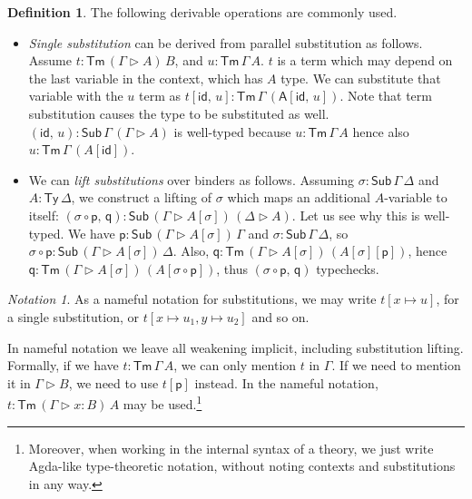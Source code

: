 \documentclass[12pt,a4paper,twoside,openany]{book}
\theoremstyle{remark}
\newtheorem{notation}{Notation}
\theoremstyle{definition}
\newtheorem{mydefinition}{Definition}
\newcommand{\id}{\mathsf{id}}
\newcommand{\Sub}{\mathsf{Sub}}
\newcommand{\Tm}{\mathsf{Tm}}
\newcommand{\Ty}{\mathsf{Ty}}
\newcommand{\ext}{\triangleright}
\newcommand{\p}{\mathsf{p}}
\newcommand{\q}{\mathsf{q}}
\newcommand{\A}{\mathsf{A}}
\begin{document}
\begin{mydefinition} The following derivable operations are commonly used.
\label{def:cwfops}
  \begin{itemize}
    \item \emph{Single substitution} can be derived from parallel substitution
      as follows. Assume $t : \Tm\,(\Gamma\ext A)\,B$, and $u :
      \Tm\,\Gamma\,A$. $t$ is a term which may depend on the last variable in
      the context, which has $A$ type. We can substitute that variable with the
      $u$ term as $t[\id,\,u] : \Tm\,\Gamma\,(\A[\id,\,u])$. Note that term
      substitution causes the type to be substituted as well. $(\id,\,u) :
      \Sub\,\Gamma\,(\Gamma\ext A)$ is well-typed because $u : \Tm\,\Gamma\,A$
      hence also $u : \Tm\,\Gamma\,(A[\id])$.

    \item We can \emph{lift substitutions} over binders as follows. Assuming
      $\sigma : \Sub\,\Gamma\,\Delta$ and $A : \Ty\,\Delta$, we construct a
      lifting of $\sigma$ which maps an additional $A$-variable to itself:
      $(\sigma\circ\p,\,\q) : \Sub\,(\Gamma\ext A[\sigma])\,(\Delta \ext A)$.
      Let us see why this is well-typed. We have $\p : \Sub\,(\Gamma\ext
      A[\sigma])\,\Gamma$ and $\sigma : \Sub\,\Gamma\,\Delta$, so $\sigma \circ
      \p : \Sub\,(\Gamma\ext A[\sigma])\,\Delta$. Also, $\q : \Tm\,(\Gamma\ext
      A[\sigma])\,(A[\sigma][\p])$, hence $\q : \Tm\,(\Gamma\ext
      A[\sigma])\,(A[\sigma \circ \p])$, thus $(\sigma\circ \p,\,\q)$
      typechecks.
  \end{itemize}
\end{mydefinition}

\begin{notation}

As a nameful notation for substitutions, we may write $t[x \mapsto u]$, for
a single substitution, or $t[x \mapsto u_1, y \mapsto u_2]$ and so on.

In nameful notation we leave all weakening implicit, including substitution
lifting. Formally, if we have $t : \Tm\,\Gamma\,A$, we can only mention $t$ in
$\Gamma$. If we need to mention it in $\Gamma \ext B$, we need to use $t[\p]$
instead. In the nameful notation, $t : \Tm\,(\Gamma\ext x : B)\,A$ may be
used.\footnote{Moreover, when working in the internal syntax of a theory, we
just write Agda-like type-theoretic notation, without noting contexts and
substitutions in any way.}
\end{notation}
\end{document}
